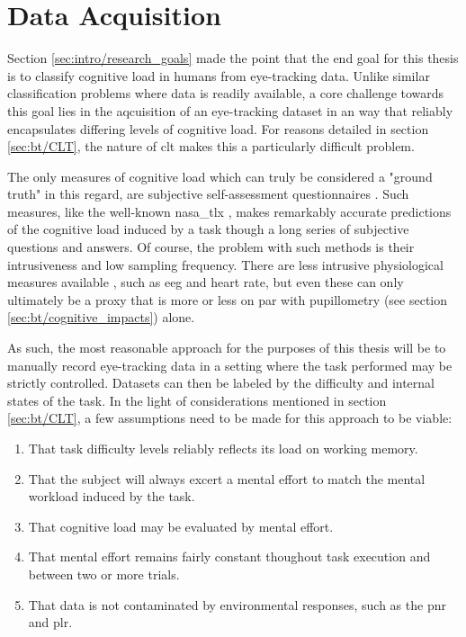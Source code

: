 \section{Data Acquisition} \label{sec:impl/data_acq}

Section \ref{sec:intro/research_goals} made the point that the end goal for this thesis is to classify cognitive load in humans from eye-tracking data. Unlike similar classification problems where data is readily available, a core challenge towards this goal lies in the aqcuisition of an eye-tracking dataset in an way that reliably encapsulates differing levels of cognitive load. For reasons detailed in section \ref{sec:bt/CLT}, the nature of \acrshort{clt} makes this a particularly difficult problem. 

The only measures of cognitive load which can truly be considered a "ground truth" in this regard, are subjective self-assessment questionnaires \cite{sharma2020, herbig2020}. Such measures, like the well-known \acrfull{nasa_tlx} \cite{hart1988}, makes remarkably accurate predictions of the cognitive load induced by a task though a long series of subjective questions and answers. Of course, the problem with such methods is their intrusiveness and low sampling frequency. There are less intrusive physiological measures available \cite{skulmowski2017}, such as \acrshort{eeg} and heart rate, but even these can only ultimately be a proxy that is more or less on par with pupillometry (see section \ref{sec:bt/cognitive_impacts}) alone.

As such, the most reasonable approach for the purposes of this thesis will be to manually record eye-tracking data in a setting where the task performed may be strictly controlled. Datasets can then be labeled by the difficulty and internal states of the task. In the light of considerations mentioned in section \ref{sec:bt/CLT}, a few assumptions need to be made for this approach to be viable:

\begin{enumerate}
    \item That task difficulty levels reliably reflects its load on working memory. \label{itm:Ass1}
    \item That the subject will always excert a mental effort to match the mental workload induced by the task. \label{itm:Ass2}
    \item That cognitive load may be evaluated by mental effort. \label{itm:Ass3}
    \item That mental effort remains fairly constant thoughout task execution and between two or more trials. \label{itm:Ass4}
    \item That data is not contaminated by environmental responses, such as the \acrshort{pnr} and \acrshort{plr}. \label{itm:Ass5}
\end{enumerate}

